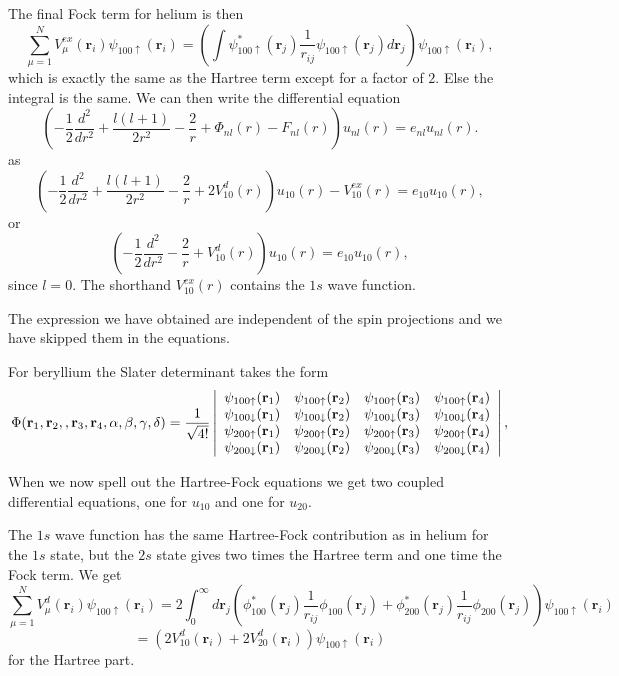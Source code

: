 The final Fock term for helium is then
\[
  \sum_{\mu=1}^NV_{\mu}^{ex}(\mathbf{r}_i) \psi_{100\uparrow}(\mathbf{r}_i) 
  = \left(\int \psi_{100\uparrow}^*(\mathbf{r}_j) 
  \frac{1}{r_{ij}}\psi_{100\uparrow}(\mathbf{r}_j) d\mathbf{r}_j
  \right)\psi_{100\uparrow}(\mathbf{r}_i),
\]
which is exactly the same as the Hartree term except for a factor of $2$. Else the integral is the same. 
We can then write the differential equation
\[
 \left( -\frac{1}{2} \frac{d^2}{dr^2} +\frac{l (l + 1)}{2r^2}-\frac{2}{r}+ \Phi_{nl}(r)-F_{nl}(r)\right ) u_{nl}(r)  = e_{nl} u_{nl}(r) .
\]
as
\[
  \left(-\frac{1}{2} \frac{d^2}{dr^2} 
       +\frac{l (l + 1)}{2r^2}-\frac{2}{r}+ 2V_{10}^{d}(r)\right ) u_{10}(r)-V_{10}^{ex}(r)  = e_{10} u_{10}(r), 
\]
or
\[
  \left(-\frac{1}{2} \frac{d^2}{dr^2} -\frac{2}{r}+ V_{10}^{d}(r)\right ) u_{10}(r)  = e_{10} u_{10}(r), 
\]
since $l=0$.
The shorthand $V_{10}^{ex}(r)$ contains the $1s$ wave function.

The expression we have obtained are independent of  the spin projections and we have skipped them in the equations.



For beryllium the Slater determinant takes the form  
\[
   \Phi({\bf r}_1,{\bf r}_2,,{\bf r}_3,{\bf r}_4, \alpha,\beta,\gamma,\delta)=\frac{1}{\sqrt{4!}}
\left| \begin{array}{cccc} \psi_{100\uparrow}({\bf r}_1)& \psi_{100\uparrow}({\bf r}_2)& \psi_{100\uparrow}({\bf r}_3)&\psi_{100\uparrow}({\bf r}_4) \\
\psi_{100\downarrow}({\bf r}_1)& \psi_{100\downarrow}({\bf r}_2)& \psi_{100\downarrow}({\bf r}_3)&\psi_{100\downarrow}({\bf r}_4) \\
\psi_{200\uparrow}({\bf r}_1)& \psi_{200\uparrow}({\bf r}_2)& \psi_{200\uparrow}({\bf r}_3)&\psi_{200\uparrow}({\bf r}_4) \\
\psi_{200\downarrow}({\bf r}_1)& \psi_{200\downarrow}({\bf r}_2)& \psi_{200\downarrow}({\bf r}_3)&\psi_{200\downarrow}({\bf r}_4) \end{array} \right|,
\]

When we now spell out the Hartree-Fock equations we get two coupled differential equations, one for $u_{10}$ and one for $u_{20}$.

The $1s$ wave function has the same Hartree-Fock contribution as in helium for the $1s$ state, 
but the $2s$ state gives two times the Hartree term 
and one time the Fock term.
We get
\[
  \sum_{\mu=1}^NV_{\mu}^{d}(\mathbf{r}_i)\psi_{100\uparrow}(\mathbf{r}_i)=2\int_0^{\infty}d\mathbf{r}_j\left( \phi_{100}^*(\mathbf{r}_j) 
  \frac{1}{r_{ij}}\phi_{100}(\mathbf{r}_j)+\phi_{200}^*(\mathbf{r}_j) 
  \frac{1}{r_{ij}}\phi_{200}(\mathbf{r}_j) \right)\psi_{100\uparrow}(\mathbf{r}_i)
\] 
\[
= (2V_{10}^d(\mathbf{r}_i)+2V_{20}^d(\mathbf{r}_i))\psi_{100\uparrow}(\mathbf{r}_i)
\]
for the Hartree part.

